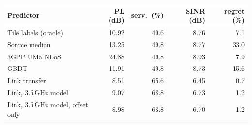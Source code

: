 \begin{tabular}{lrrrr}
\toprule
Predictor & PL (dB) & serv.\ (\%) & SINR (dB) & regret (\%) \\
\midrule
Tile labels (oracle) & 10.92 & 49.6 & 8.76 & 7.1 \\
\midrule
Source median & 13.25 & 49.8 & 8.77 & 33.0 \\
3GPP UMa NLoS & 24.88 & 49.8 & 8.93 & 7.9 \\
GBDT & 11.91 & 49.8 & 8.73 & 15.6 \\
\midrule
Link transfer & 8.51 & 65.6 & 6.45 & 0.7 \\
Link, 3.5\,GHz model & 9.07 & 68.8 & 6.73 & 1.2 \\
Link, 3.5\,GHz model, offset only & 8.98 & 68.8 & 6.70 & 1.2 \\
\bottomrule
\end{tabular}
